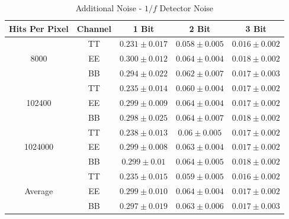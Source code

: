 \documentclass[apj]{emulateapj}
\begin{document}
\def\arraystretch{1.3}
\begin{table}[tbh]
\begin{center}
\caption{\label{tab:extranoiseoof} Additional Noise - $1/f$ Detector Noise}
\small
\begin{tabular}{c c c c c}
Hits Per Pixel & Channel & 1 Bit & 2 Bit & 3 Bit \\
\hline
\hline
\multirow{3}{*}{8000}  & TT  & $ 0.231 \pm 0.017 $  & $ 0.058 \pm 0.005 $  & $ 0.016 \pm 0.002 $ \\
& EE  & $ 0.300 \pm 0.012 $  & $ 0.064 \pm 0.004 $  & $ 0.018 \pm 0.002 $ \\
& BB  & $ 0.294 \pm 0.022 $  & $ 0.062 \pm 0.007 $  & $ 0.017 \pm 0.003 $ \\
\hline
\multirow{3}{*}{102400}  & TT  & $ 0.235 \pm 0.014 $  & $ 0.060 \pm 0.004 $  & $ 0.017 \pm 0.002 $ \\
& EE  & $ 0.299 \pm 0.009 $  & $ 0.064 \pm 0.004 $  & $ 0.017 \pm 0.002 $ \\
& BB  & $ 0.298 \pm 0.025 $  & $ 0.064 \pm 0.007 $  & $ 0.018 \pm 0.002 $ \\
\hline
\multirow{3}{*}{1024000}  & TT  & $ 0.238 \pm 0.013 $  & $ 0.06 \pm 0.005 $  & $ 0.017 \pm 0.002 $ \\
& EE  & $ 0.299 \pm 0.008 $  & $ 0.063 \pm 0.004 $  & $ 0.017 \pm 0.002 $ \\
& BB  & $ 0.299 \pm 0.01 $  & $ 0.064 \pm 0.005 $  & $ 0.018 \pm 0.002 $ \\
\hline
\multirow{3}{*}{Average}  & TT  & $ 0.235 \pm 0.015 $  & $ 0.059 \pm 0.005 $  & $ 0.016 \pm 0.002 $ \\
 & EE  & $ 0.299 \pm 0.010 $  & $ 0.064 \pm 0.004 $  & $ 0.017 \pm 0.002 $ \\
 & BB  & $ 0.297 \pm 0.019 $  & $ 0.063 \pm 0.006 $  & $ 0.017 \pm 0.003 $ \\
\end{tabular}
 \normalsize
\end{center}
\end{table}


\end{document}
